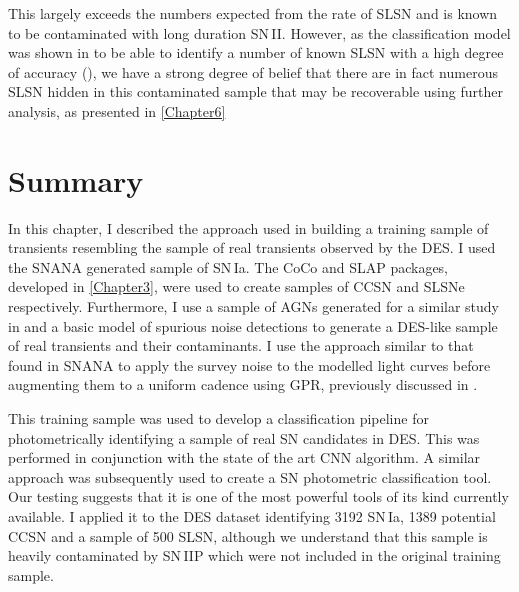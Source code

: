 This largely exceeds the numbers expected from the rate of SLSN and is known to be contaminated with long duration SN\,II. However, as the classification model was shown in  to be able to identify a number of known SLSN with a high degree of accuracy (), we have a strong degree of belief that there are in fact numerous SLSN hidden in this contaminated sample that may be recoverable using further analysis, as presented in \cref{Chapter6}

\section{Summary}
In this chapter, I described the approach used in building a training sample of transients resembling the sample of real transients observed by the DES. I used the SNANA generated sample of SN\,Ia. The CoCo and SLAP packages, developed in \cref{Chapter3}, were used to create samples of CCSN and SLSNe respectively. Furthermore, I use a sample of AGNs generated for a similar study in \citet{Hoenig2014} and a basic model of spurious noise detections to generate a DES-like sample of real transients and their contaminants. I use the approach similar to that found in SNANA to apply the survey noise to the modelled light curves before augmenting them to a uniform cadence using GPR, previously discussed in .

This training sample was used to develop a classification pipeline for photometrically identifying a sample of real SN candidates in DES. This was performed in conjunction with the state of the art CNN algorithm. A similar approach was subsequently used to create a SN photometric classification tool. Our testing suggests that it is one of the most powerful tools of its kind currently available. I applied it to the DES dataset identifying 3192 SN\,Ia, 1389 potential CCSN and a sample of 500 SLSN, although we understand that this sample is heavily contaminated by SN\,IIP which were not included in the original training sample.

